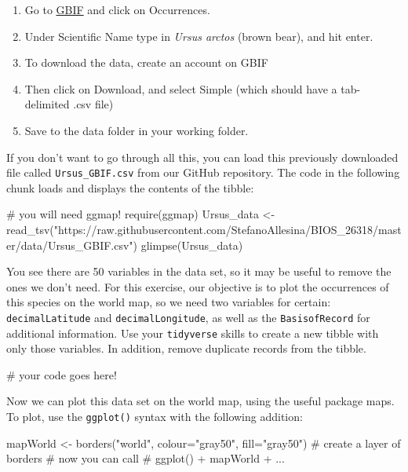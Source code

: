 \documentclass[
  letterpaper,
  DIV=11,
  numbers=noendperiod]{scrreprt}
\newenvironment{Shaded}{\begin{snugshade}}{\end{snugshade}}
\newcommand{\NormalTok}[1]{\textcolor[rgb]{0.00,0.23,0.31}{#1}}
\providecommand{\tightlist}{%
  \setlength{\itemsep}{0pt}\setlength{\parskip}{0pt}}\usepackage{longtable,booktabs,array}
\begin{document}
\begin{enumerate}
\def\labelenumi{\arabic{enumi}.}
\tightlist
\item
  Go to \href{https://www.gbif.org/en/}{GBIF} and click on Occurrences.
\item
  Under Scientific Name type in \emph{Ursus arctos} (brown bear), and
  hit enter.
\item
  To download the data, create an account on GBIF
\item
  Then click on Download, and select Simple (which should have a
  tab-delimited .csv file)
\item
  Save to the data folder in your working folder.
\end{enumerate}

If you don't want to go through all this, you can load this previously
downloaded file called \texttt{Ursus\_GBIF.csv} from our GitHub
repository. The code in the following chunk loads and displays the
contents of the tibble:

\begin{Shaded}
\begin{Highlighting}[]
\NormalTok{\# you will need ggmap!}
\NormalTok{require(ggmap)}
\NormalTok{Ursus\_data \textless{}{-} read\_tsv("https://raw.githubusercontent.com/StefanoAllesina/BIOS\_26318/master/data/Ursus\_GBIF.csv")}
\NormalTok{glimpse(Ursus\_data)}
\end{Highlighting}
\end{Shaded}

You see there are 50 variables in the data set, so it may be useful to
remove the ones we don't need. For this exercise, our objective is to
plot the occurrences of this species on the world map, so we need two
variables for certain: \texttt{decimalLatitude} and
\texttt{decimalLongitude}, as well as the \texttt{BasisofRecord} for
additional information. Use your \texttt{tidyverse} skills to create a
new tibble with only those variables. In addition, remove duplicate
records from the tibble.

\begin{Shaded}
\begin{Highlighting}[]
\NormalTok{\# your code goes here!}
\end{Highlighting}
\end{Shaded}

Now we can plot this data set on the world map, using the useful package
maps. To plot, use the \texttt{ggplot()} syntax with the following
addition:

\begin{Shaded}
\begin{Highlighting}[]
\NormalTok{mapWorld \textless{}{-} borders("world", colour="gray50", fill="gray50") \# create a layer of borders}
\NormalTok{\# now you can call }
\NormalTok{\# ggplot() + mapWorld + ...}
\end{Highlighting}
\end{Shaded}
\end{document}

